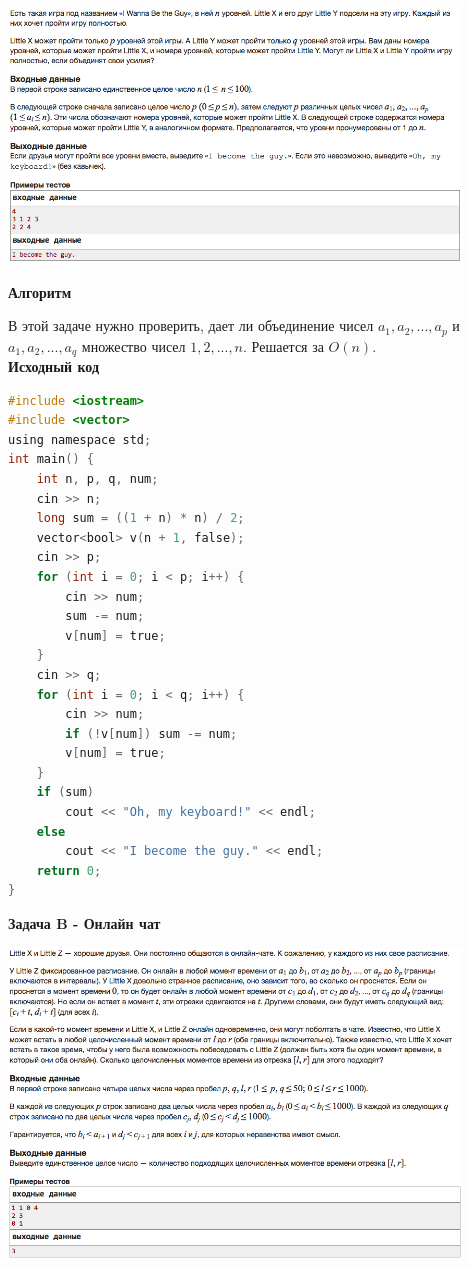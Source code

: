 \documentclass[a4paper,12pt]{article}
\begin{document}
\begin{center}
\includegraphics[width=0.9\textwidth]{C_268/C_268_A.png}\\ [1cm]
\end{center}

\textbf{{\large Алгоритм}}

В этой задаче нужно проверить, дает ли объединение чисел $a_1, a_2, ... , a_p$ и $a_1, a_2, ... , a_q$ множество чисел $1, 2, ... , n$. Решается за $O(n)$.\\

\textbf{{\large Исходный код}} \\
\begin{lstlisting}[language=C]
#include <iostream>
#include <vector>
using namespace std;
int main() {
    int n, p, q, num;
    cin >> n;
    long sum = ((1 + n) * n) / 2;
    vector<bool> v(n + 1, false);
    cin >> p;
    for (int i = 0; i < p; i++) {
        cin >> num;
        sum -= num;
        v[num] = true;
    }
    cin >> q;
    for (int i = 0; i < q; i++) {
        cin >> num;
        if (!v[num]) sum -= num;
        v[num] = true;
    }
    if (sum)
        cout << "Oh, my keyboard!" << endl;
    else
        cout << "I become the guy." << endl;
    return 0;
}
\end{lstlisting}

\newpage
\textbf{{\large Задача B - Онлайн чат}}

\begin{center}
\includegraphics[width=0.9\textwidth]{C_268/C_268_B.png}\\ [1cm]
\end{center}
\end{document}
